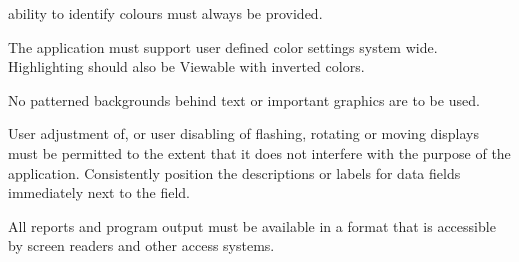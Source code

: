 \begin{itemize*}
  ability to identify colours must always be provided.
\item The application must support user defined color settings system
  wide. Highlighting should also be Viewable with inverted colors.
\item No patterned backgrounds behind text or important graphics are
  to be used.
\item User adjustment of, or user disabling of flashing, rotating or
  moving displays must be permitted to the extent that it does not
  interfere with the purpose of the application.  Consistently
  position the descriptions or labels for data fields immediately next
  to the field.
\item All reports and program output must be available in a format
  that is accessible by screen readers and other access systems.
\end{itemize*}

\cbend


